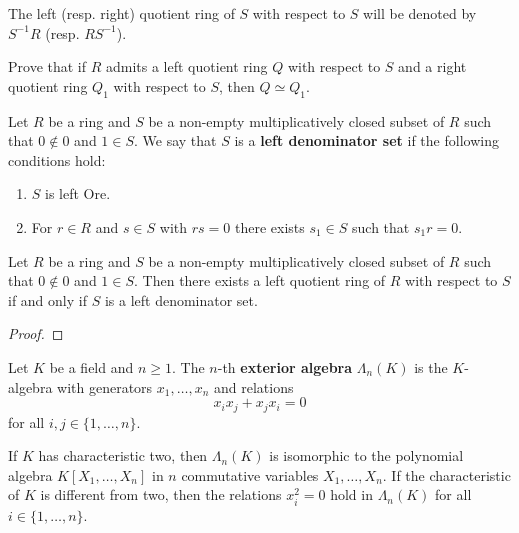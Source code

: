The left (resp. right) quotient ring of $S$ 
with respect to $S$ will be denoted by $S^{-1}R$ (resp. $RS^{-1}$). 

\begin{exercise}
    Prove that if $R$ admits a left quotient ring $Q$ with respect to $S$ and a right quotient ring $Q_1$ with
    respect to $S$, then $Q\simeq Q_1$.  
\end{exercise}

\begin{definition}
    Let $R$ be a ring and 
    $S$ be a non-empty multiplicatively closed subset of $R$ such that $0\not\in 0$ and 
    $1\in S$. We say that $S$ is a \textbf{left denominator set} if 
    the following conditions hold:
    \begin{enumerate}
        \item $S$ is left Ore.
        \item For $r\in R$ and $s\in S$ with $rs=0$ there exists $s_1\in S$ such that $s_1r=0$. 
    \end{enumerate}
\end{definition}

\begin{theorem}
    Let $R$ be a ring and $S$ be a non-empty multiplicatively closed subset of $R$ such that $0\not\in 0$ and 
    $1\in S$. Then there exists a left quotient ring of $R$ with respect to $S$
    if and only if $S$ is a left denominator set. 
\end{theorem}

\begin{proof}
    
\end{proof}



\begin{definition}
    Let $K$ be a field and $n\geq1$. The $n$-th 
    \textbf{exterior algebra} 
    $\Lambda_n(K)$ is the $K$-algebra
    with generators $x_1,\dots,x_n$ and relations 
    \[
    x_ix_j+x_jx_i=0
    \]
    for all $i,j\in\{1,\dots,n\}$. 
\end{definition}

If $K$ has characteristic two, then $\Lambda_n(K)$ is isomorphic to 
the polynomial algebra $K[X_1,\dots,X_n]$ in $n$ commutative variables $X_1,\dots,X_n$. If the characteristic 
of $K$ is different from two, then the relations 
$x_i^2=0$ hold in $\Lambda_n(K)$ 
for all $i\in\{1,\dots,n\}$. 

